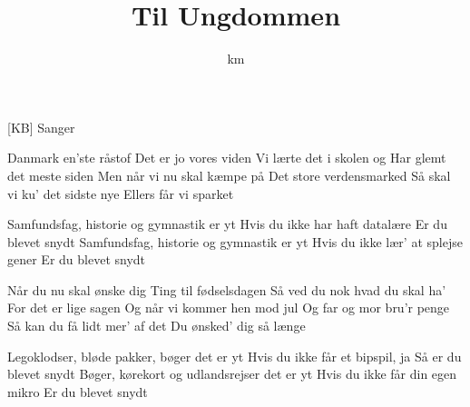 \documentclass[a4paper,11pt]{article}
\title{Til Ungdommen}
\author{km}
\begin{document}
\maketitle

\begin{roles}
[KB] Sanger
\end{roles}

\begin{song}

  Danmark en'ste råstof
  Det er jo vores viden
  Vi lærte det i skolen og
  Har glemt det meste siden
  Men når vi nu skal kæmpe på
  Det store verdensmarked
  Så skal vi ku' det sidste nye
  Ellers får vi sparket

  Samfundsfag, historie og gymnastik er yt
  Hvis du ikke har haft datalære
  Er du blevet snydt
  Samfundsfag, historie og gymnastik er yt
  Hvis du ikke lær' at splejse gener
  Er du blevet snydt

  Når du nu skal ønske dig
  Ting til fødselsdagen
  Så ved du nok hvad du skal ha'
  For det er lige sagen
  Og når vi kommer hen mod jul
  Og far og mor bru'r penge
  Så kan du få lidt mer' af det
  Du ønsked' dig så længe

  Legoklodser, bløde pakker, bøger det er yt
  Hvis du ikke får et bipspil, ja
  Så er du blevet snydt
  Bøger, kørekort og udlandsrejser det er yt
  Hvis du ikke får din egen mikro
  Er du blevet snydt

\end{song}
\end{document}

